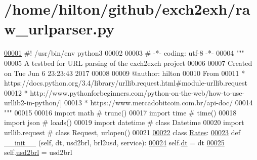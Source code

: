 \hypertarget{raw__urlparser_8py_source}{}\section{/home/hilton/github/exch2exh/raw\+\_\+urlparser.py}

\begin{DoxyCode}
\hypertarget{raw__urlparser_8py_source.tex_l00001}{}\hyperlink{namespaceraw__urlparser}{00001} \textcolor{comment}{#! /usr/bin/env python3 }
00002 
00003 \textcolor{comment}{# -*- coding: utf-8 -*-}
00004 \textcolor{stringliteral}{"""}
00005 \textcolor{stringliteral}{A testbed for URL parsing of the exch2exch project}
00006 \textcolor{stringliteral}{}
00007 \textcolor{stringliteral}{Created on Tue Jun  6 23:23:43 2017}
00008 \textcolor{stringliteral}{}
00009 \textcolor{stringliteral}{@author: hilton}
00010 \textcolor{stringliteral}{From }
00011 \textcolor{stringliteral}{* https://docs.python.org/3.4/library/urllib.request.html#module-urllib.request}
00012 \textcolor{stringliteral}{* http://www.pythonforbeginners.com/python-on-the-web/how-to-use-urllib2-in-python/]}
00013 \textcolor{stringliteral}{* https://www.mercadobitcoin.com.br/api-doc/}
00014 \textcolor{stringliteral}{"""}
00015 
00016 \textcolor{keyword}{import} math           \textcolor{comment}{# trunc()  }
00017 \textcolor{keyword}{import} time           \textcolor{comment}{# time()  }
00018 \textcolor{keyword}{import} json           \textcolor{comment}{# loads()  }
00019 \textcolor{keyword}{import} datetime       \textcolor{comment}{# class Datetime  }
00020 \textcolor{keyword}{import} urllib.request \textcolor{comment}{# class Request, urlopen()}
00021 
\hypertarget{raw__urlparser_8py_source.tex_l00022}{}\hyperlink{classraw__urlparser_1_1_rates}{00022} \textcolor{keyword}{class }\hyperlink{classraw__urlparser_1_1_rates}{Rates}:
\hypertarget{raw__urlparser_8py_source.tex_l00023}{}\hyperlink{classraw__urlparser_1_1_rates_a7d9b61bce159f7e52bdf8a1ebfada45d}{00023}     \textcolor{keyword}{def }\hyperlink{classraw__urlparser_1_1_rates_a7d9b61bce159f7e52bdf8a1ebfada45d}{\_\_init\_\_} (self, dt, usd2brl, brl2usd, service):
\hypertarget{raw__urlparser_8py_source.tex_l00024}{}\hyperlink{classraw__urlparser_1_1_rates_a09b3c7cb595f3135c3eda648b1bb4c3f}{00024}         self.\hyperlink{classraw__urlparser_1_1_rates_a09b3c7cb595f3135c3eda648b1bb4c3f}{dt}  = dt
\hypertarget{raw__urlparser_8py_source.tex_l00025}{}\hyperlink{classraw__urlparser_1_1_rates_a52d9b688be8385a87783b27839749b4a}{00025}         self.\hyperlink{classraw__urlparser_1_1_rates_a52d9b688be8385a87783b27839749b4a}{usd2brl} = usd2brl

\end{DoxyCode}
